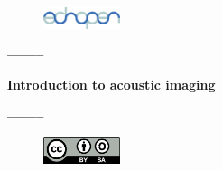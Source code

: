 \thispagestyle{empty}

\noindent

\vspace*{0.6cm}

\begin{center}
{\bf\huge }
\noindent\vspace*{0,5cm}

{}
\noindent\vspace*{0,5cm}

{\bf\huge }
\noindent\vspace*{0,5cm}


\noindent\vspace*{1cm}


\noindent\vspace*{1cm}

\begin{figure}[htb]
  \centering
		\includegraphics[width=0.2\textwidth]{image/logo}
\end{figure}
\noindent\vspace*{0,5cm}


\noindent\vspace*{0,5cm}


\noindent\vspace*{1cm}

{\bf --------}
\noindent\vspace*{0.2cm}

{\bf \Huge Introduction to acoustic imaging}
\noindent\vspace*{0,2cm}

{\bf --------}
\noindent\vspace*{0,9cm}
\end{center}

\noindent

\vspace*{0.4cm}

\noindent

\noindent\vspace*{0.4cm}
\noindent


\vspace*{0.4cm}

\noindent
\noindent\vspace*{0,5cm}
\begin{figure}[htb]
  \centering
		\includegraphics[width=0.2\textwidth]{image/license}
\end{figure}
\noindent







